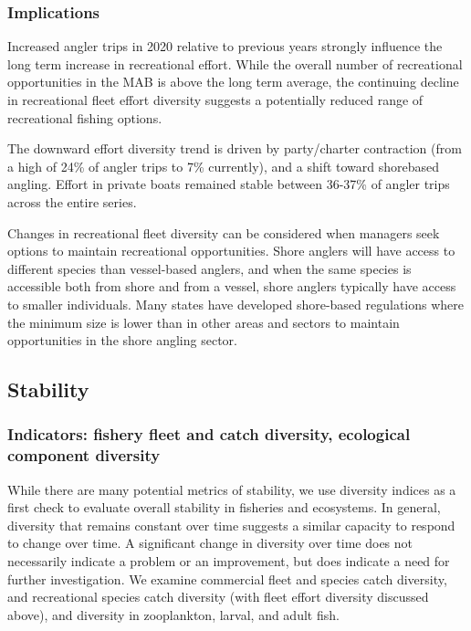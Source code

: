 \documentclass[
  10pt,
]{article}
\begin{document}
\hypertarget{implications-2}{%
\subsubsection{Implications}\label{implications-2}}

Increased angler trips in 2020 relative to previous years strongly
influence the long term increase in recreational effort. While the
overall number of recreational opportunities in the MAB is above the
long term average, the continuing decline in recreational fleet effort
diversity suggests a potentially reduced range of recreational fishing
options.

The downward effort diversity trend is driven by party/charter
contraction (from a high of 24\% of angler trips to 7\% currently), and
a shift toward shorebased angling. Effort in private boats remained
stable between 36-37\% of angler trips across the entire series.

Changes in recreational fleet diversity can be considered when managers
seek options to maintain recreational opportunities. Shore anglers will
have access to different species than vessel-based anglers, and when the
same species is accessible both from shore and from a vessel, shore
anglers typically have access to smaller individuals. Many states have
developed shore-based regulations where the minimum size is lower than
in other areas and sectors to maintain opportunities in the shore
angling sector.

\hypertarget{stability}{%
\subsection{Stability}\label{stability}}

\hypertarget{indicators-fishery-fleet-and-catch-diversity-ecological-component-diversity}{%
\subsubsection{Indicators: fishery fleet and catch diversity, ecological
component
diversity}\label{indicators-fishery-fleet-and-catch-diversity-ecological-component-diversity}}

While there are many potential metrics of stability, we use diversity
indices as a first check to evaluate overall stability in fisheries and
ecosystems. In general, diversity that remains constant over time
suggests a similar capacity to respond to change over time. A
significant change in diversity over time does not necessarily indicate
a problem or an improvement, but does indicate a need for further
investigation. We examine commercial fleet and species catch diversity,
and recreational species catch diversity (with fleet effort diversity
discussed above), and diversity in zooplankton, larval, and adult fish.
\end{document}
